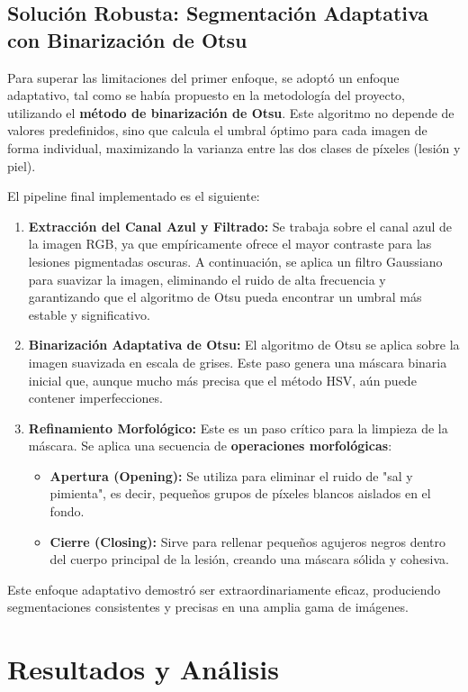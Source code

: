 \documentclass[12pt, a4paper]{article}
\begin{document}
	\subsection{Solución Robusta: Segmentación Adaptativa con Binarización de Otsu}
	
	Para superar las limitaciones del primer enfoque, se adoptó un enfoque adaptativo, tal como se había propuesto en la metodología del proyecto, utilizando el \textbf{método de binarización de Otsu}. Este algoritmo no depende de valores predefinidos, sino que calcula el umbral óptimo para cada imagen de forma individual, maximizando la varianza entre las dos clases de píxeles (lesión y piel).
	
	El pipeline final implementado es el siguiente:
	\begin{enumerate}
		\item \textbf{Extracción del Canal Azul y Filtrado:} Se trabaja sobre el canal azul de la imagen RGB, ya que empíricamente ofrece el mayor contraste para las lesiones pigmentadas oscuras. A continuación, se aplica un filtro Gaussiano para suavizar la imagen, eliminando el ruido de alta frecuencia y garantizando que el algoritmo de Otsu pueda encontrar un umbral más estable y significativo.
		\item \textbf{Binarización Adaptativa de Otsu:} El algoritmo de Otsu se aplica sobre la imagen suavizada en escala de grises. Este paso genera una máscara binaria inicial que, aunque mucho más precisa que el método HSV, aún puede contener imperfecciones.
		\item \textbf{Refinamiento Morfológico:} Este es un paso crítico para la limpieza de la máscara. Se aplica una secuencia de \textbf{operaciones morfológicas}:
		\begin{itemize}
			\item \textbf{Apertura (Opening):} Se utiliza para eliminar el ruido de "sal y pimienta", es decir, pequeños grupos de píxeles blancos aislados en el fondo.
			\item \textbf{Cierre (Closing):} Sirve para rellenar pequeños agujeros negros dentro del cuerpo principal de la lesión, creando una máscara sólida y cohesiva.
		\end{itemize}
	\end{enumerate}
	Este enfoque adaptativo demostró ser extraordinariamente eficaz, produciendo segmentaciones consistentes y precisas en una amplia gama de imágenes.
	
	\section{Resultados y Análisis}
	
\end{document}
